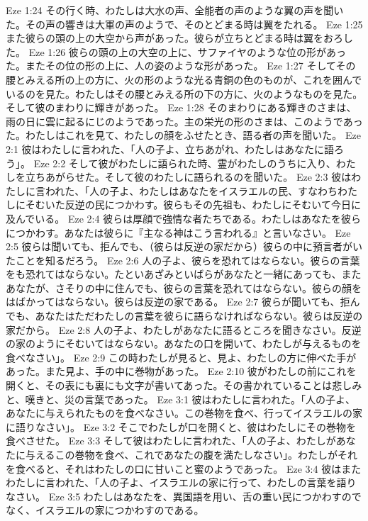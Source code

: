 Eze 1:24  その行く時、わたしは大水の声、全能者の声のような翼の声を聞いた。その声の響きは大軍の声のようで、そのとどまる時は翼をたれる。
Eze 1:25  また彼らの頭の上の大空から声があった。彼らが立ちとどまる時は翼をおろした。
Eze 1:26  彼らの頭の上の大空の上に、サファイヤのような位の形があった。またその位の形の上に、人の姿のような形があった。
Eze 1:27  そしてその腰とみえる所の上の方に、火の形のような光る青銅の色のものが、これを囲んでいるのを見た。わたしはその腰とみえる所の下の方に、火のようなものを見た。そして彼のまわりに輝きがあった。
Eze 1:28  そのまわりにある輝きのさまは、雨の日に雲に起るにじのようであった。主の栄光の形のさまは、このようであった。わたしはこれを見て、わたしの顔をふせたとき、語る者の声を聞いた。
Eze 2:1  彼はわたしに言われた、「人の子よ、立ちあがれ、わたしはあなたに語ろう」。
Eze 2:2  そして彼がわたしに語られた時、霊がわたしのうちに入り、わたしを立ちあがらせた。そして彼のわたしに語られるのを聞いた。
Eze 2:3  彼はわたしに言われた、「人の子よ、わたしはあなたをイスラエルの民、すなわちわたしにそむいた反逆の民につかわす。彼らもその先祖も、わたしにそむいて今日に及んでいる。
Eze 2:4  彼らは厚顔で強情な者たちである。わたしはあなたを彼らにつかわす。あなたは彼らに『主なる神はこう言われる』と言いなさい。
Eze 2:5  彼らは聞いても、拒んでも、（彼らは反逆の家だから）彼らの中に預言者がいたことを知るだろう。
Eze 2:6  人の子よ、彼らを恐れてはならない。彼らの言葉をも恐れてはならない。たといあざみといばらがあなたと一緒にあっても、またあなたが、さそりの中に住んでも、彼らの言葉を恐れてはならない。彼らの顔をはばかってはならない。彼らは反逆の家である。
Eze 2:7  彼らが聞いても、拒んでも、あなたはただわたしの言葉を彼らに語らなければならない。彼らは反逆の家だから。
Eze 2:8  人の子よ、わたしがあなたに語るところを聞きなさい。反逆の家のようにそむいてはならない。あなたの口を開いて、わたしが与えるものを食べなさい」。
Eze 2:9  この時わたしが見ると、見よ、わたしの方に伸べた手があった。また見よ、手の中に巻物があった。
Eze 2:10  彼がわたしの前にこれを開くと、その表にも裏にも文字が書いてあった。その書かれていることは悲しみと、嘆きと、災の言葉であった。
Eze 3:1  彼はわたしに言われた。「人の子よ、あなたに与えられたものを食べなさい。この巻物を食べ、行ってイスラエルの家に語りなさい」。
Eze 3:2  そこでわたしが口を開くと、彼はわたしにその巻物を食べさせた。
Eze 3:3  そして彼はわたしに言われた、「人の子よ、わたしがあなたに与えるこの巻物を食べ、これであなたの腹を満たしなさい」。わたしがそれを食べると、それはわたしの口に甘いこと蜜のようであった。
Eze 3:4  彼はまたわたしに言われた、「人の子よ、イスラエルの家に行って、わたしの言葉を語りなさい。
Eze 3:5  わたしはあなたを、異国語を用い、舌の重い民につかわすのでなく、イスラエルの家につかわすのである。
